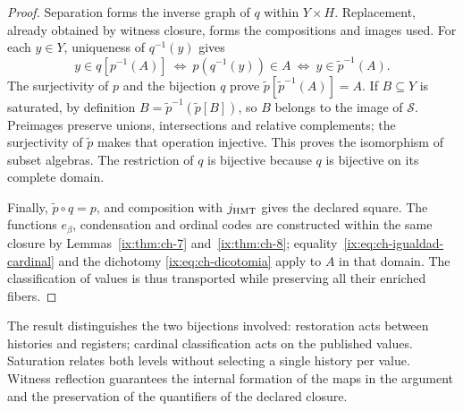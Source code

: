 \begin{proof}
Separation forms the inverse graph of \(q\) within \(Y\times H\).
Replacement, already obtained by witness closure, forms the compositions
and images used. For each \(y\in Y\), uniqueness of
\(q^{-1}(y)\) gives
\[
 y\in q[p^{-1}(A)]
 \ \Longleftrightarrow\ p(q^{-1}(y))\in A
 \ \Longleftrightarrow\ y\in\widetilde p^{-1}(A).
\]
The surjectivity of \(p\) and the bijection \(q\) prove
\(\widetilde p[\widetilde p^{-1}(A)]=A\). If \(B\subseteq Y\)
is saturated, by definition
\(B=\widetilde p^{-1}(\widetilde p[B])\), so \(B\)
belongs to the image of \(\mathcal S\). Preimages preserve
unions, intersections and relative complements; the surjectivity of
\(\widetilde p\) makes that operation injective. This proves the
isomorphism of subset algebras. The restriction of \(q\) is
bijective because \(q\) is bijective on its complete domain.

Finally, \(\widetilde p\circ q=p\), and composition with
\(j_{\rm HMT}\) gives the declared square. The functions \(e_\beta\),
condensation and ordinal codes are constructed within the same
closure by Lemmas~\ref{ix:thm:ch-7} and~\ref{ix:thm:ch-8}; equality~\eqref{ix:eq:ch-igualdad-cardinal} and the dichotomy
\eqref{ix:eq:ch-dicotomia} apply to \(A\) in that domain. The
classification of values is thus transported while preserving all their
enriched fibers.
\end{proof}

The result distinguishes the two bijections involved: restoration
acts between histories and registers; cardinal classification acts on
the published values. Saturation relates both levels without
selecting a single history per value. Witness reflection guarantees
the internal formation of the maps in the argument and the preservation of the
quantifiers of the declared closure.
